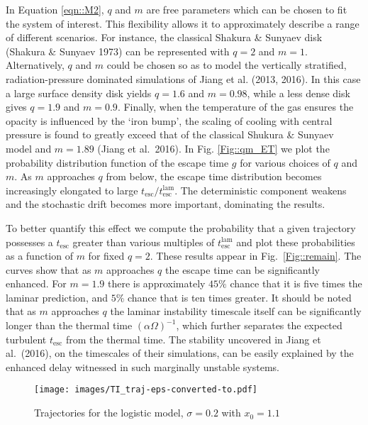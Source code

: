 \documentclass[useAMS]{mn2e}
\begin{document}
In Equation \eqref{eqn::M2}, $q$ and $m$ are free
  parameters which can be chosen to fit the system of interest. This
  flexibility
  allows it to approximately describe a range of different scenarios. 
  For
  instance, the classical Shakura \& Sunyaev disk (Shakura \& Sunyaev
  1973) can be represented with $q=2$ and $m=1$. Alternatively, $q$ and
  $m$ could be chosen so as to model the vertically stratified, radiation-pressure
  dominated simulations of Jiang et al. (2013, 2016). In this case a
  large surface density disk yields $q=1.6$ and $m=0.98$, while a less dense
  disk gives $q=1.9$ and $m=0.9$. Finally, when the temperature of the
  gas ensures the
  opacity is influenced by the `iron bump', the scaling of cooling with central
  pressure is found to greatly exceed that of the classical Shukura \&
  Sunyaev model and $m=1.89$ (Jiang et al.~2016). In
  Fig. \ref{Fig::qm_ET} we plot the probability distribution function
  of the escape time $g$ for various choices of $q$ and $m$. As $m$
  approaches $q$ from below, the escape time distribution becomes
  increasingly elongated to large
  $t_{\text{esc}}/t^{\text{lam}}_{\text{esc}}$. 
  The deterministic component
  weakens and the stochastic drift becomes more important, dominating the
  results.

 To better quantify this effect we compute the probability
  that a given trajectory possesses a $t_{\text{esc}}$ greater than
  various multiples of $t^{\text{lam}}_{\text{esc}}$ and plot these
  probabilities as a function of $m$ for fixed $q=2$. These results
  appear in Fig.~\ref{Fig::remain}. The curves show that as $m$
  approaches $q$ the escape time can be significantly enhanced. For
  $m=1.9$ there is approximately $45\%$ chance that it is five times
  the laminar prediction, and $5\%$ chance that is ten times greater.
  It should be noted that as $m$ approaches $q$ the laminar instability
  timescale itself can be significantly longer than the thermal 
  time $(\alpha\Omega)^{-1}$, which further separates the expected
  turbulent $t_{\text{esc}}$ from the thermal time. The stability
  uncovered in Jiang et al.~(2016), on the timescales of their
  simulations, can be easily explained by the enhanced delay witnessed
  in such
  marginally unstable systems.


\begin{figure}
\texttt{[image: images/TI\_traj-eps-converted-to.pdf]}
\caption{Trajectories for the logistic model, $\sigma=0.2$ with $x_{0}=1.1$}
\label{Fig::TI_traj}
\end{figure}
\end{document}
